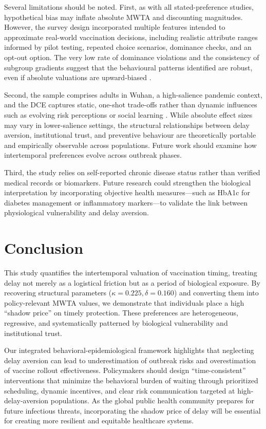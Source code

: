 \documentclass[preprint,12pt]{elsarticle}
\begin{document}
Several limitations should be noted. First, as with all stated-preference studies, hypothetical bias may inflate absolute MWTA and discounting magnitudes. However, the survey design incorporated multiple features intended to approximate real-world vaccination decisions, including realistic attribute ranges informed by pilot testing, repeated choice scenarios, dominance checks, and an opt-out option. The very low rate of dominance violations and the consistency of subgroup gradients suggest that the behavioural patterns identified are robust, even if absolute valuations are upward-biased \cite{Louviere2000,Johnson2013}.

Second, the sample comprises adults in Wuhan, a high-salience pandemic context, and the DCE captures static, one-shot trade-offs rather than dynamic influences such as evolving risk perceptions or social learning \cite{Lievre2024,Tran2025}. While absolute effect sizes may vary in lower-salience settings, the structural relationships between delay aversion, institutional trust, and preventive behaviour are theoretically portable and empirically observable across populations. Future work should examine how intertemporal preferences evolve across outbreak phases.

Third, the study relies on self-reported chronic disease status rather than verified medical records or biomarkers. Future research could strengthen the biological interpretation by incorporating objective health measures---such as HbA1c for diabetes management or inflammatory markers---to validate the link between physiological vulnerability and delay aversion.


\section{Conclusion}

This study quantifies the intertemporal valuation of vaccination timing, treating delay not 
merely as a logistical friction but as a period of biological exposure. By recovering 
structural parameters ($\kappa = 0.225, \delta = 0.160$) and converting them into 
policy-relevant MWTA values, we demonstrate that individuals place a high ``shadow price'' 
on timely protection. These preferences are heterogeneous, regressive, and 
systematically patterned by biological vulnerability and institutional trust.

Our integrated behavioral-epidemiological framework highlights that neglecting delay 
aversion can lead to underestimation of outbreak risks and overestimation of vaccine 
rollout effectiveness. Policymakers should design ``time-consistent'' interventions that 
minimize the behavioral burden of waiting through prioritized scheduling, dynamic 
incentives, and clear risk communication targeted at high-delay-aversion populations. 
As the global public health community prepares for future infectious threats, 
incorporating the shadow price of delay will be essential for creating more resilient 
and equitable healthcare systems.
\end{document}
